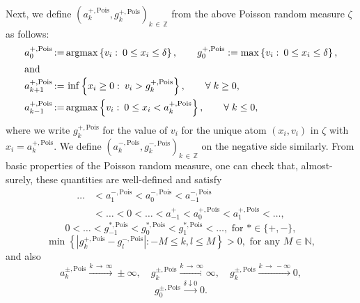 \documentclass[10pt]{amsart}
\theoremstyle{definition}\newtheorem{defi}[theo]{Definition}\newtheorem{rema}[theo]{Remark}\newtheorem{exam}[theo]{Example}\newtheorem{exem}[theo]{Example}\newtheorem{nota}[theo]{Notation}
\newcommand{\N}{\mathbb N}
\newcommand{\Z}{\mathbb Z}
\newcommand{\argmax}{\mathrm{argmax}}
\newcommand{\Pois}{\text{Pois}}
\let\oldforall\forall
\renewcommand*{\forall}{\mathrel{\oldforall}}
\begin{document}
Next, we define $(a_k^{+,\Pois},g_k^{+,\Pois})_{k\,\in\,\Z}$ from the above Poisson random measure $\zeta$ as follows:
\begin{align*}
a_0^{+,\Pois}\,&{:=}\,\argmax\left\{v_i:\:0\leq x_i\leq \delta\right\},\qquad g_0^{+,\Pois}:=\max\left\{v_i:\:0\leq x_i\leq \delta\right\},
\\
\intertext{and}
a_{k+1}^{+,\Pois}\,&{:=}\,\inf\left\{x_i\geq 0:\:v_i>g_{k}^{+,\Pois}\right\},\qquad \forall k\geq 0,
\\
a_{k-1}^{+,\Pois}\,&{:=}\,\argmax\left\{v_i:\:0\leq x_i<a_{k}^{+,\Pois}\right\},\qquad \forall k\leq 0,
\end{align*}
where we write $g_k^{+,\Pois}$ for the value of $v_i$ for the unique atom $(x_i,v_i)$ in $\zeta$ with $x_i=a_k^{+,\Pois}$. We define $(a_k^{-,\Pois},g_k^{-,\Pois})_{k\,\in\,\Z}$ on the negative side similarly. From basic properties of the Poisson random measure, one can check that, almost-surely, these quantities are well-defined and satisfy
\begin{equation}\label{aok}
\begin{split}
\dots&<a_1^{-,\Pois}<a_0^{-,\Pois}<a_{-1}^{-,\Pois}\\
&<\dots<0<\dots<a_{-1}^+<a_0^{+,\Pois}<a_1^{+,\Pois}<\dots,
\end{split}
\end{equation}
\begin{equation}\label{gok}
0<\dots<g_{-1}^{*,\Pois}<g_0^{*,\Pois}<g_1^{*,\Pois}<\dots, \text{ for }*\in\{+,-\},
\end{equation}
\begin{equation}\label{gsep}
\min\left\{\left|g_k^{+,\Pois}-g_l^{-,\Pois}\right|\colon -M\le k, l \le M\right\}>0, \text{ for any }M\in\N,
\end{equation}
and also
\begin{equation}\label{adiv}
a_k^{\pm,\Pois}\xrightarrow{k\,\rightarrow\,\infty} \pm \infty, \quad g_k^{\pm,\Pois}\xrightarrow{k\,\rightarrow\,\infty} \infty,\quad g_k^{\pm,\Pois}\xrightarrow{k\,\rightarrow\,-\infty}0,
\end{equation}
\begin{equation}\label{gto0}
g_0^{\pm,\Pois}\xrightarrow{\delta\downarrow 0} 0.
\end{equation}
\end{document}
